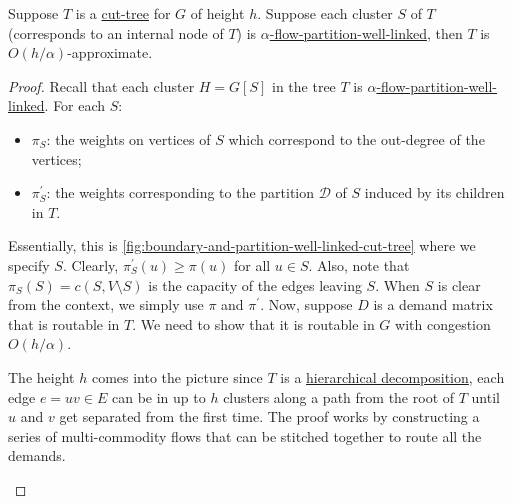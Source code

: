 \begin{lemma}\label{lma:hierarchical-expander-decomposition-characterization}
	Suppose \(T\) is a \hyperref[def:cut-tree]{cut-tree} for \(G\) of height \(h\). Suppose each cluster \(S\) of \(T\) (corresponds to an internal node of \(T\)) is \hyperref[def:partition-and-boundary-well-linked]{\(\alpha \)-flow-partition-well-linked}, then \(T\) is \(O(h / \alpha )\)-approximate.
\end{lemma}
\begin{proof}
	Recall that each cluster \(H= G[S]\) in the tree \(T\) is \hyperref[def:partition-and-boundary-well-linked]{\(\alpha \)-flow-partition-well-linked}. For each \(S\):
	\begin{itemize}
		\item \(\pi _S\): the weights on vertices of \(S\) which correspond to the out-degree of the vertices;
		\item \(\pi _S^{\prime} \): the weights corresponding to the partition \(\mathcal{D} \) of \(S\) induced by its children in \(T\).
	\end{itemize}
	Essentially, this is \autoref{fig:boundary-and-partition-well-linked-cut-tree} where we specify \(S\). Clearly, \(\pi _S^{\prime} (u) \geq \pi (u)\) for all \(u \in S\). Also, note that \(\pi _S(S) = c(S, V\setminus S)\) is the capacity of the edges leaving \(S\). When \(S\) is clear from the context, we simply use \(\pi \) and \(\pi ^{\prime} \). Now, suppose \(D\) is a demand matrix that is routable in \(T\). We need to show that it is routable in \(G\) with congestion \(O(h / \alpha )\).

	\begin{intuition}
		The height \(h\) comes into the picture since \(T\) is a \hyperref[def:hierarchical-decomposition]{hierarchical decomposition}, each edge \(e = uv \in E\) can be in up to \(h\) clusters along a path from the root of \(T\) until \(u\) and \(v\) get separated from the first time. The proof works by constructing a series of multi-commodity flows that can be stitched together to route all the demands.
	\end{intuition}


\end{proof}
